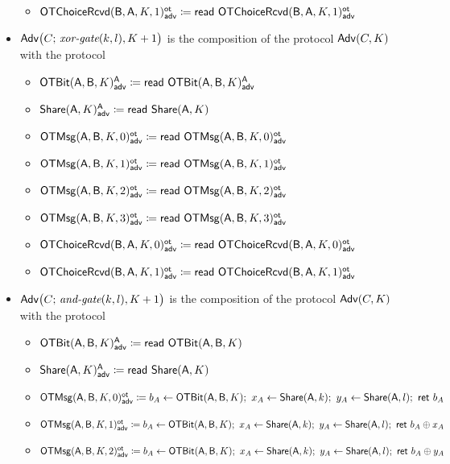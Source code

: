 \begin{itemize}
\begin{itemize}
\item {\color{blue} $\LeakOTChoiceRcvd(\B,\A,K,1)^\ot_\adv \coloneqq \read{\LeakOTChoiceRcvd(\B,\A,K,1)^\ot_\adv}$}
\end{itemize}
\item $\Adv\big(C; \, \xorgate(k,l),K+1\big)$ is the composition of the protocol $\Adv(C,K)$ with the protocol
\begin{itemize}
\item {\color{blue} $\LeakOTBit(\A,\B,K)^\A_\adv \coloneqq \read{\LeakOTBit(\A,\B,K)^\A_\adv}$}
\item {\color{blue} $\LeakShare(\A,K)^\A_\adv \coloneqq \read{\Share(\A,K)}$}\medskip
\item {\color{blue} $\LeakOTMsg(\A,\B,K,0)^\ot_\adv \coloneqq \read{\LeakOTMsg(\A,\B,K,0)^\ot_\adv}$}
\item {\color{blue} $\LeakOTMsg(\A,\B,K,1)^\ot_\adv \coloneqq \read{\LeakOTMsg(\A,\B,K,1)^\ot_\adv}$}
\item {\color{blue} $\LeakOTMsg(\A,\B,K,2)^\ot_\adv \coloneqq \read{\LeakOTMsg(\A,\B,K,2)^\ot_\adv}$}
\item {\color{blue} $\LeakOTMsg(\A,\B,K,3)^\ot_\adv \coloneqq \read{\LeakOTMsg(\A,\B,K,3)^\ot_\adv}$}\medskip
\item {\color{blue} $\LeakOTChoiceRcvd(\B,\A,K,0)^\ot_\adv \coloneqq \read{\LeakOTChoiceRcvd(\B,\A,K,0)^\ot_\adv}$}
\item {\color{blue} $\LeakOTChoiceRcvd(\B,\A,K,1)^\ot_\adv \coloneqq \read{\LeakOTChoiceRcvd(\B,\A,K,1)^\ot_\adv}$}
\end{itemize}
\item $\Adv\big(C; \, \andgate(k,l),K+1\big)$ is the composition of the protocol $\Adv(C,K)$ with the protocol
\begin{itemize}
\item {\color{blue} $\LeakOTBit(\A,\B,K)^\A_\adv \coloneqq \read{\OTBit(\A,\B,K)}$}
\item {\color{blue} $\LeakShare(\A,K)^\A_\adv \coloneqq \read{\Share(\A,K)}$}\medskip
\item {\color{blue} $\LeakOTMsg(\A,\B,K,0)^\ot_\adv \coloneqq b_A \leftarrow \OTBit(\A,\B,K); \ x_A \leftarrow \Share(\A,k); \ y_A \leftarrow \Share(\A,l); \ \ret{b_A}$}
\item {\color{blue} $\LeakOTMsg(\A,\B,K,1)^\ot_\adv \coloneqq b_A \leftarrow \OTBit(\A,\B,K); \ x_A \leftarrow \Share(\A,k); \ y_A \leftarrow \Share(\A,l); \ \ret{b_A \oplus x_A}$}
\item {\color{blue} $\LeakOTMsg(\A,\B,K,2)^\ot_\adv \coloneqq b_A \leftarrow \OTBit(\A,\B,K); \ x_A \leftarrow \Share(\A,k); \ y_A \leftarrow \Share(\A,l); \ \ret{b_A \oplus y_A}$}

\end{itemize}
\end{itemize}
